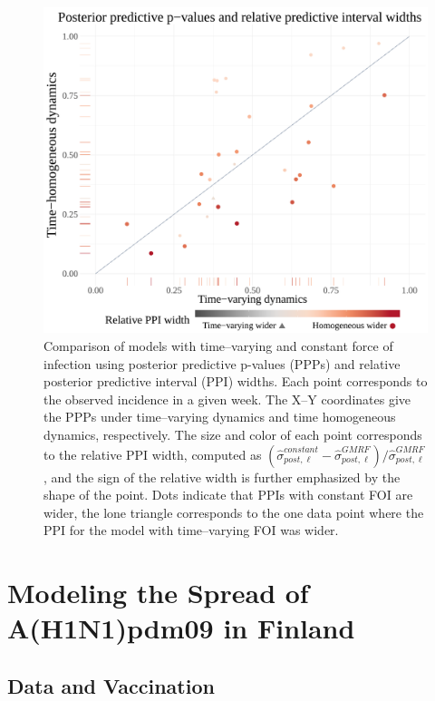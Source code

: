 \begin{figure}[htbp]
	\centering
	\includegraphics[width=0.8\linewidth]{figures/sinfoi_ppi_comp}
	\caption[Comparison with posterior predictive p-values and relative predictive interval widths for SIRS models fit to an outbreak with time--varying dynamics.]{Comparison of models with time--varying and constant force of infection using posterior predictive p-values (PPPs) and relative posterior predictive interval (PPI) widths. Each point corresponds to the observed incidence in a given week. The X--Y coordinates give the PPPs under time--varying dynamics and time homogeneous dynamics, respectively. The size and color of each point corresponds to the relative PPI width, computed as $ (\widehat{\sigma}_{post,\ell}^{constant} - \widehat{\sigma}_{post,\ell}^{GMRF})/\widehat{\sigma}_{post,\ell}^{GMRF} $, and the sign of the relative width is further emphasized by the shape of the point. Dots indicate that PPIs with constant FOI are wider, the lone triangle corresponds to the one data point where the PPI for the model with time--varying FOI was wider.}
	\label{fig:sinfoi_ppi_comp}
\end{figure}

\newpage
\section{Modeling the Spread of A(H1N1)pdm09 in Finland}
\label{sec:flu_tparam_models}

\subsection{Data and Vaccination}
\label{subsec:flu_datavacc}

